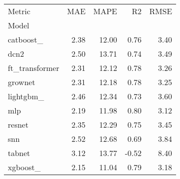 \begin{tabular}{lrrrr}
\toprule
Metric &  MAE &  MAPE &    R2 &  RMSE \\
Model          &      &       &       &       \\
\midrule
catboost\_      & 2.38 & 12.00 &  0.76 &  3.40 \\
dcn2           & 2.50 & 13.71 &  0.74 &  3.49 \\
ft\_transformer & 2.31 & 12.12 &  0.78 &  3.26 \\
grownet        & 2.31 & 12.18 &  0.78 &  3.25 \\
lightgbm\_      & 2.46 & 12.34 &  0.73 &  3.60 \\
mlp            & 2.19 & 11.98 &  0.80 &  3.12 \\
resnet         & 2.35 & 12.29 &  0.75 &  3.45 \\
snn            & 2.52 & 12.68 &  0.69 &  3.84 \\
tabnet         & 3.12 & 13.77 & -0.52 &  8.40 \\
xgboost\_       & 2.15 & 11.04 &  0.79 &  3.18 \\
\bottomrule
\end{tabular}
